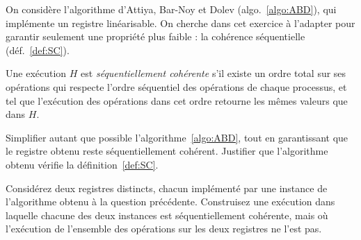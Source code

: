 
\begingroup



\begin{exercice}

  On considère l'algorithme d'Attiya, Bar-Noy et Dolev (algo.~\ref{algo:ABD}),
  qui implémente un registre linéarisable.
  On cherche dans cet exercice à l'adapter pour garantir seulement une propriété plus faible :
  la cohérence séquentielle (déf.~\ref{def:SC}).

  \begin{algorithm}[H]
    \caption{Implémentation d'un registre linéarisable}
    \label{algo:ABD}
  \end{algorithm}

  \begin{definition}\label{def:SC}
    Une exécution $H$ est \emph{séquentiellement cohérente} s'il existe un ordre total
    sur ses opérations qui respecte l'ordre séquentiel des opérations de chaque processus,
    et tel que l'exécution des opérations dans cet ordre retourne les mêmes valeurs que dans $H$.
  \end{definition}

  \begin{questions}
  \item Simplifier autant que possible l'algorithme~\ref{algo:ABD}, tout en garantissant
    que le registre obtenu reste séquentiellement cohérent.
    Justifier que l'algorithme obtenu vérifie la définition~\ref{def:SC}.
    
  \item Considérez deux registres distincts, chacun implémenté par une instance de l'algorithme
    obtenu à la question précédente.
    Construisez une exécution dans laquelle chacune des deux instances est séquentiellement cohérente,
    mais où l'exécution de l'ensemble des opérations sur les deux registres ne l'est pas.
  \end{questions}

\end{exercice}

\endgroup
\endinput
